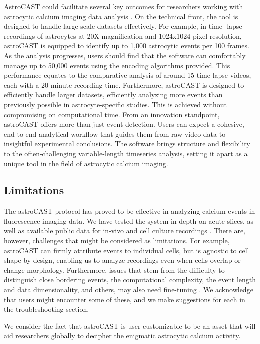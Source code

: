 AstroCAST could facilitate several key outcomes for researchers working with astrocytic calcium imaging data analysis
. On the technical front, the tool is designed to handle large-scale datasets effectively. For example, in time
-lapse recordings of astrocytes at 20X magnification and 1024x1024 pixel resolution, astroCAST is equipped to
identify up to 1,000 astrocytic events per 100 frames. As the analysis progresses, users should find that the
software can comfortably manage up to 50,000 events using the encoding algorithms provided. This performance equates
to the comparative analysis of around 15 time-lapse videos, each with a 20-minute recording time. Furthermore,
astroCAST is designed to efficiently handle larger datasets, efficiently analyzing more events than previously
possible in astrocyte-specific studies. This is achieved without compromising on computational time. From an
innovation standpoint, astroCAST offers more than just event detection. Users can expect a cohesive, end-to-end
analytical workflow that guides them from raw video data to insightful experimental conclusions. The software brings
structure and flexibility to the often-challenging variable-length timeseries analysis, setting it apart as a unique
tool in the field of astrocytic calcium imaging.

\subsection{Limitations}

The astroCAST protocol has proved to be effective in analyzing calcium events in fluorescence imaging data. We have
tested the system in depth on acute slices, as well as available public data for in-vivo and cell culture recordings
. There are, however, challenges that might be considered as limitations. For example, astroCAST can firmly attribute
events to individual cells, but is agnostic to cell shape by design, enabling us to analyze recordings even when
cells overlap or change morphology. Furthermore, issues that stem from the difficulty to distinguish close bordering
events, the computational complexity, the event length and data dimensionality, and others, may also need fine-tuning
. We acknowledge that users might encounter some of these, and we make suggestions for each in the troubleshooting
section.

We consider the fact that astroCAST is user customizable to be an asset that will aid researchers globally to
decipher the enigmatic astrocytic calcium activity.